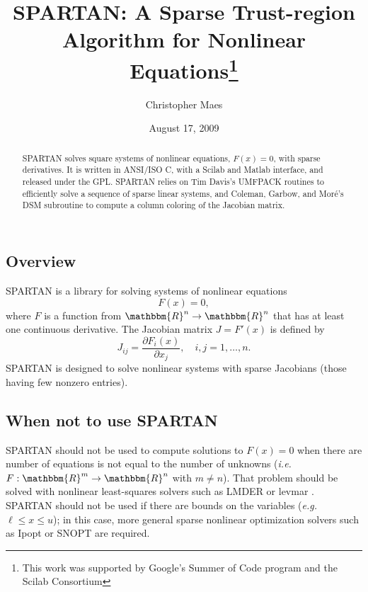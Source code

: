 \documentclass[10pt]{article}
\newcommand{\solverf}{\sffamily}
\newcommand{\R}{\mathbbm{R}}
\renewcommand{\l}{\ell}
\newcommand{\matlab}{{\sc Matlab}}
\newcommand{\scilab}{{\sc Scilab}}
\newcommand{\spartan}{{\solverf SPARTAN}}
\newcommand{\dsm}{{\solverf DSM}}
\newcommand{\umfpack}{{\solverf UMFPACK}}
\newcommand{\snopt}{{\solverf SNOPT}}
\newcommand{\ipopt}{{\solverf Ipopt}}
\newcommand{\lmder}{{\solverf LMDER}}
\newcommand{\levmar}{{\solverf levmar}}
\begin{document}
 

\author{Christopher Maes}
\title{\spartan : A Sparse Trust-region Algorithm for Nonlinear Equations\thanks{This work was supported by Google's Summer of Code program and the Scilab Consortium}}
\date{August 17, 2009}
\newcommand{\shorttitle}{{\solverf SPARTAN}}
\pretitle{\begin{center}\Large}
\posttitle{\par\end{center}\vskip 0.5em}
\predate{\begin{center}\normalsize}
\postdate{\par\end{center}}
\maketitle
\begin{abstract}
\spartan{} solves square systems of nonlinear equations, $F(x) = 0$,
with sparse derivatives. It is written in ANSI/ISO C, with a \scilab{}
and \matlab{} interface, and released under the GPL. \spartan{} relies
on Tim Davis's \umfpack{} routines to efficiently solve a
sequence of sparse linear systems, and Coleman, Garbow, and Mor\'{e}'s
\dsm{} subroutine to compute a column coloring of the Jacobian matrix. 
\end{abstract}

\subsection*{Overview}

\spartan{} is a library for solving  systems of nonlinear equations
\begin{equation}
F(x) = 0,
\label{nonlineqn}
\end{equation}
where $F$ is a function from $\R^n \to \R^n$ that has at least one
continuous derivative. The Jacobian matrix $J = F'(x)$ is defined by
\begin{equation*}
J_{ij}  = \frac{\partial F_i(x)}{\partial x_j}, \quad i,j = 1, \ldots, n.
\end{equation*}
\spartan{} is designed to solve nonlinear systems with sparse
Jacobians (those having few nonzero entries). 


\subsection*{When not to use \spartan{}}

\spartan{} should not be used to compute solutions to $F(x) = 0$ when
there are number of equations is not equal to the number of unknowns
(\emph{i.e.\ }$F: \R^m \to \R^n$ with $m \ne n$). That problem should
be solved with nonlinear least-squares solvers such as \lmder{}
\cite{minpack} or \levmar{} \cite{levmar:website}. \spartan{} should
not be used if there are bounds on the variables (\emph{e.g.\ }$\l \le
x \le u$); in this case, more general sparse nonlinear optimization
solvers such as \ipopt{}\cite{ipopt:website} or \snopt{}
\cite{snopt:website} are required.
\end{document}
